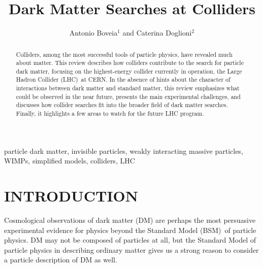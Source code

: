 \documentclass{ar-1col}
\begin{document}

\title{Dark Matter Searches at Colliders}

\author{Antonio Boveia$^1$ and Caterina Doglioni$^2$
 }

\begin{abstract}

Colliders, among the most successful tools of particle physics,
have revealed much about matter. This review describes how
colliders contribute to the search for particle dark matter,
focusing on the highest-energy collider currently in operation,
the Large Hadron Collider (LHC)\ at CERN. In the absence of hints about the character
of interactions between dark matter and standard matter, this review emphasizes what could be observed in the
near future, presents the main experimental challenges, and discusses how
collider searches fit into the broader field of dark matter searches. Finally, it
highlights a few areas to watch for the future LHC program.
\end{abstract}

\begin{keywords}
particle dark matter, invisible particles, weakly interacting
massive particles, WIMPs, simplified models, colliders, LHC
\end{keywords}

\maketitle

\tableofcontents

\section{INTRODUCTION}\label{sec:intro}

Cosmological observations of dark matter (DM) are perhaps the most persuasive experimental
evidence for physics beyond the Standard Model (BSM)\ of particle physics.
DM may not be composed of particles at all, but the Standard Model of particle physics
in describing ordinary matter gives us a strong reason to consider a particle description of DM as well. 
\end{document}
